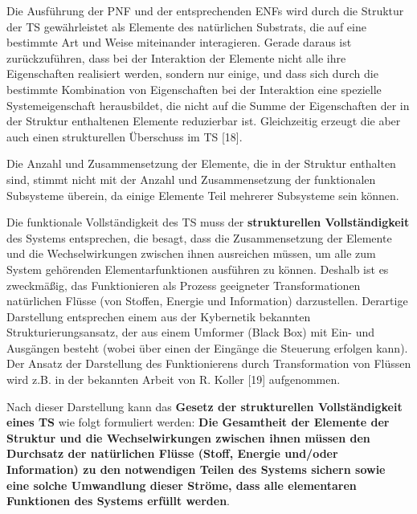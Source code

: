 \documentclass[11pt,a4paper]{article}
\begin{document}
Die Ausführung der PNF und der entsprechenden ENFs wird durch die Struktur der
TS gewährleistet als Elemente des natürlichen Substrats, die auf eine
bestimmte Art und Weise miteinander interagieren.  Gerade daraus ist
zurückzuführen, dass bei der Interaktion der Elemente nicht alle ihre
Eigenschaften realisiert werden, sondern nur einige, und dass sich durch die
bestimmte Kombination von Eigenschaften bei der Interaktion eine spezielle
Systemeigenschaft herausbildet, die nicht auf die Summe der Eigenschaften der
in der Struktur enthaltenen Elemente reduzierbar ist.  Gleichzeitig erzeugt
die aber auch einen strukturellen Überschuss im TS [18].

Die Anzahl und Zusammensetzung der Elemente, die in der Struktur enthalten
sind, stimmt nicht mit der Anzahl und Zusammensetzung der funktionalen
Subsysteme überein, da einige Elemente Teil mehrerer Subsysteme sein können.

Die funktionale Vollständigkeit des TS muss der \textbf{strukturellen
  Vollständigkeit} des Systems entsprechen, die besagt, dass die
Zusammensetzung der Elemente und die Wechselwirkungen zwischen ihnen
ausreichen müssen, um alle zum System gehörenden Elementarfunktionen ausführen
zu können.  Deshalb ist es zweckmäßig, das Funktionieren als Prozess
geeigneter Transformationen natürlichen Flüsse (von Stoffen, Energie und
Information) darzustellen. Derartige Darstellung entsprechen einem aus der
Kybernetik bekannten Strukturierungsansatz, der aus einem Umformer (Black Box)
mit Ein- und Ausgängen besteht (wobei über einen der Eingänge die Steuerung
erfolgen kann). Der Ansatz der Darstellung des Funktionierens durch
Transformation von Flüssen wird z.B. in der bekannten Arbeit von R. Koller
[19] aufgenommen.

Nach dieser Darstellung kann das \textbf{Gesetz der strukturellen
  Vollständigkeit eines TS} wie folgt formuliert werden: \textbf{Die
  Gesamtheit der Elemente der Struktur und die Wechselwirkungen zwischen ihnen
  müssen den Durchsatz der natürlichen Flüsse (Stoff, Energie und/oder
  Information) zu den notwendigen Teilen des Systems sichern sowie eine solche
  Umwandlung dieser Ströme, dass alle elementaren Funktionen des Systems
  erfüllt werden}.
\end{document}
